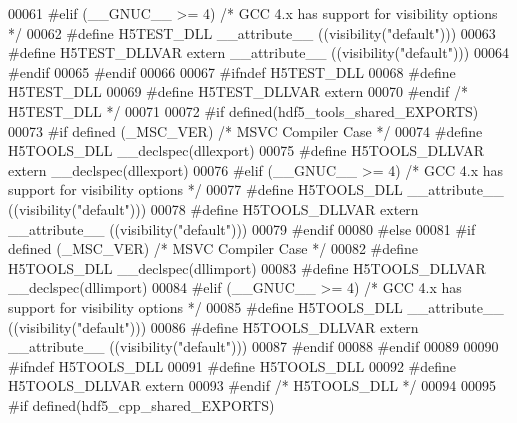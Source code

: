 \begin{DoxyCode}
00061 \textcolor{preprocessor}{  #elif (\_\_GNUC\_\_ >= 4)  }\textcolor{comment}{/* GCC 4.x has support for visibility options */}\textcolor{preprocessor}{}
00062 \textcolor{preprocessor}{    #define H5TEST\_DLL \_\_attribute\_\_ ((visibility("default")))}
00063 \textcolor{preprocessor}{    #define H5TEST\_DLLVAR extern \_\_attribute\_\_ ((visibility("default")))}
00064 \textcolor{preprocessor}{  #endif}
00065 \textcolor{preprocessor}{#endif}
00066 
00067 \textcolor{preprocessor}{#ifndef H5TEST\_DLL}
00068 \textcolor{preprocessor}{  #define H5TEST\_DLL}
00069 \textcolor{preprocessor}{  #define H5TEST\_DLLVAR extern}
00070 \textcolor{preprocessor}{#endif }\textcolor{comment}{/* H5TEST\_DLL */}\textcolor{preprocessor}{}
00071 
00072 \textcolor{preprocessor}{#if defined(hdf5\_tools\_shared\_EXPORTS)}
00073 \textcolor{preprocessor}{  #if defined (\_MSC\_VER)  }\textcolor{comment}{/* MSVC Compiler Case */}\textcolor{preprocessor}{}
00074 \textcolor{preprocessor}{    #define H5TOOLS\_DLL \_\_declspec(dllexport)}
00075 \textcolor{preprocessor}{    #define H5TOOLS\_DLLVAR extern \_\_declspec(dllexport)}
00076 \textcolor{preprocessor}{  #elif (\_\_GNUC\_\_ >= 4)  }\textcolor{comment}{/* GCC 4.x has support for visibility options */}\textcolor{preprocessor}{}
00077 \textcolor{preprocessor}{    #define H5TOOLS\_DLL \_\_attribute\_\_ ((visibility("default")))}
00078 \textcolor{preprocessor}{    #define H5TOOLS\_DLLVAR extern \_\_attribute\_\_ ((visibility("default")))}
00079 \textcolor{preprocessor}{  #endif}
00080 \textcolor{preprocessor}{#else}
00081 \textcolor{preprocessor}{  #if defined (\_MSC\_VER)  }\textcolor{comment}{/* MSVC Compiler Case */}\textcolor{preprocessor}{}
00082 \textcolor{preprocessor}{    #define H5TOOLS\_DLL \_\_declspec(dllimport)}
00083 \textcolor{preprocessor}{    #define H5TOOLS\_DLLVAR \_\_declspec(dllimport)}
00084 \textcolor{preprocessor}{  #elif (\_\_GNUC\_\_ >= 4)  }\textcolor{comment}{/* GCC 4.x has support for visibility options */}\textcolor{preprocessor}{}
00085 \textcolor{preprocessor}{    #define H5TOOLS\_DLL \_\_attribute\_\_ ((visibility("default")))}
00086 \textcolor{preprocessor}{    #define H5TOOLS\_DLLVAR extern \_\_attribute\_\_ ((visibility("default")))}
00087 \textcolor{preprocessor}{  #endif}
00088 \textcolor{preprocessor}{#endif}
00089 
00090 \textcolor{preprocessor}{#ifndef H5TOOLS\_DLL}
00091 \textcolor{preprocessor}{  #define H5TOOLS\_DLL}
00092 \textcolor{preprocessor}{  #define H5TOOLS\_DLLVAR extern}
00093 \textcolor{preprocessor}{#endif }\textcolor{comment}{/* H5TOOLS\_DLL */}\textcolor{preprocessor}{}
00094 
00095 \textcolor{preprocessor}{#if defined(hdf5\_cpp\_shared\_EXPORTS)}

\end{DoxyCode}
